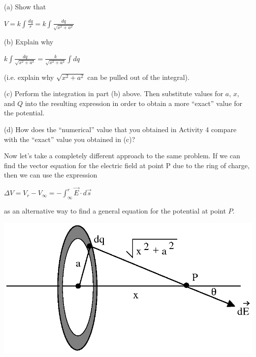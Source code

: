 (a) Show that

{\centering \( V=k\int \frac{dq}{r}=k\int \frac{dq}{\sqrt{x^{2}+a^{2}}} \)\par}
\vspace{25mm}

(b) Explain why

{\centering \( k\int \frac{dq}{\sqrt{x^{2}+a^{2}}}=\frac{k}{\sqrt{x^{2}+a^{2}}}\int dq \)\par}

(i.e. explain why \( \sqrt{x^{2}+a^{2}} \) can be pulled out of the integral).
\vspace{20mm}

(c) Perform the integration in part (b) above. Then substitute values
for $a$, $x$, and $Q$ into the resulting expression in order to obtain a
more {}``exact'' value for the potential.
\vspace{25mm}

(d) How does the {}``numerical'' value that you obtained in Activity
4 compare with the {}``exact'' value you obtained in (c)?
\vspace{20mm}

Now let's take a completely different approach to the same problem.
If we can find the vector equation for the electric field at point
P due to the ring of charge, then we can use the expression

{\centering \( \Delta V=V_{r}-V_{\infty }=-\int ^{r}_{\infty }\overrightarrow{E}\cdot d\overrightarrow{s} \)\par}

as an alternative way to find a general equation for the potential
at point $P$.

\answerspace{0.3cm}
{\centering \includegraphics{electric_potential/electric_potential_fig_6.eps} \par}
\answerspace{0.3cm}


